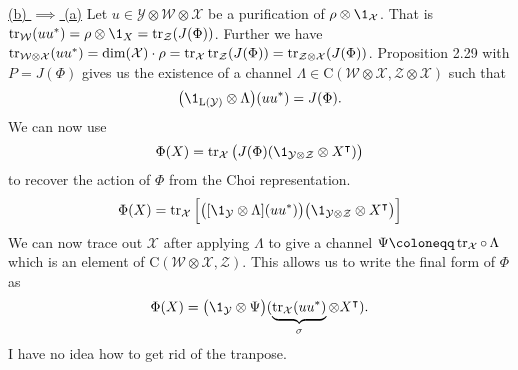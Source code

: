 \documentclass[boxes,pages,color=SeaGreen]{homework}
\newcommand{\X}{\mathcal{X}}
\newcommand{\Y}{\mathcal{Y}}
\newcommand{\Z}{\mathcal{Z}}
\newcommand{\W}{\mathcal{W}}
\newcommand{\Lin}{\mathrm{L}}
\newcommand{\Channel}{\mathrm{C}}
\begin{document}
\begin{solution}
    \noindent\hyperref[part:4b]{(b) $\implies$ (a)}
    Let $u \in \Y\otimes \W \otimes \X$ be a purification of $\rho\otimes\1_\X$.
    That is $\tr_\W(uu^*) = \rho\otimes \1_X = \tr_\Z(J(\Phi))$.
    Further we have $\tr_{\W\otimes \X}(uu^*) = \dim(\X) \cdot \rho = \tr_\X\tr_\Z(J(\Phi)) = \tr_{\Z\otimes\X}(J(\Phi))$.
    Proposition 2.29 with $P = J(\Phi)$ gives us the existence of a channel $\Lambda\in\Channel(\W\otimes\X, \Z\otimes\X)$ such that
    \begin{equation*}
        \qty(\1_{\Lin(\Y)}\otimes\Lambda)(uu^*) = J(\Phi).
    \end{equation*}
    We can now use
    \begin{equation*}
        \Phi(X) = \tr_\X\qty\big(J(\Phi)(\1_{\Y\otimes\Z}\otimes X^\intercal))
    \end{equation*}
    to recover the action of $\Phi$ from the Choi representation.
    \begin{align*}
        \Phi(X) = \tr_\X\qty\Big[\qty\big([\1_\Y\otimes\Lambda](uu^*))\qty\big(\1_{\Y\otimes\Z}\otimes X^\intercal)]
    \end{align*}
    We can now trace out $\X$ after applying $\Lambda$ to give a channel $\Psi\defeq \tr_\X\circ\,\Lambda$ which is an element of $\Channel(\W\otimes\X, \Z)$.
    This allows us to write the final form of $\Phi$ as
    \begin{equation*}
        \Phi(X) = \qty\big(\1_\Y\otimes\Psi)(\underbrace{\tr_\X(uu^*)}_{\sigma}\otimes X^\intercal).
    \end{equation*}
    I have no idea how to get rid of the tranpose.
\end{solution}
\end{document}
